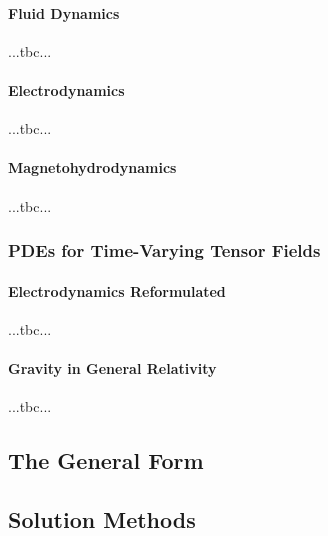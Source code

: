 \paragraph{Fluid Dynamics} ...tbc...



\paragraph{Electrodynamics} ...tbc...

\paragraph{Magnetohydrodynamics} ...tbc...




\subsubsection{PDEs for Time-Varying Tensor Fields}

\paragraph{Electrodynamics Reformulated} ...tbc...

\paragraph{Gravity in General Relativity} ...tbc...




\subsection{The General Form}



\subsection{Solution Methods}

